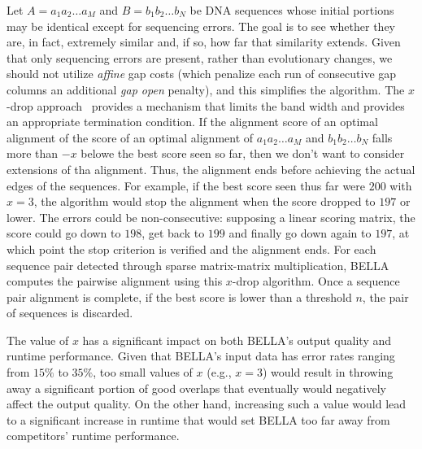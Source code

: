 Let $A = a_1a_2 \dots a_M$ and $B = b_1b_2 \dots b_N$ be DNA sequences whose initial portions may be identical except for sequencing errors.
The goal is to see whether they are, in fact, extremely similar and, if so, how far that similarity extends.
Given that only sequencing errors are present, rather than evolutionary changes, we should not utilize \textit{affine} gap costs (which penalize each run of consecutive gap columns an additional \textit{gap open} penalty), and this simplifies the algorithm.
The $x$-drop approach~ provides a mechanism that limits the band width and provides an appropriate termination condition.
If the alignment score of an optimal alignment of  the score of an optimal alignment of $a_1a_2 \dots a_M$ and $b_1b_2 \dots b_N$ falls more than $-x$ belowe the best score seen so far, then we don't want to consider extensions of tha alignment. Thus, the alignment ends before achieving the actual edges of the sequences. 
For example, if the best score seen thus far were $200$ with $x = 3$, the algorithm would stop the alignment when the score dropped to $197$ or lower.
The errors could be non-consecutive: supposing a linear scoring matrix, the score could go down to $198$, get back to $199$ and finally go down again to $197$, at which point the stop criterion is verified and the alignment ends.
For each sequence pair detected through sparse matrix-matrix multiplication, BELLA computes the pairwise alignment using this $x$-drop algorithm. 
Once a sequence pair alignment is complete, if the best score is lower than a threshold $n$, the pair of sequences is discarded.

The value of $x$ has a significant impact on both BELLA's output quality and runtime performance.
Given that BELLA's input data has error rates ranging from $15\%$ to $35\%$, too small values of $x$ (e.g., $x = 3$) would result in throwing away a significant portion of good overlaps that eventually would negatively affect the output quality.
On the other hand, increasing such a value would lead to a significant increase in runtime that would set BELLA too far away from competitors' runtime performance.
